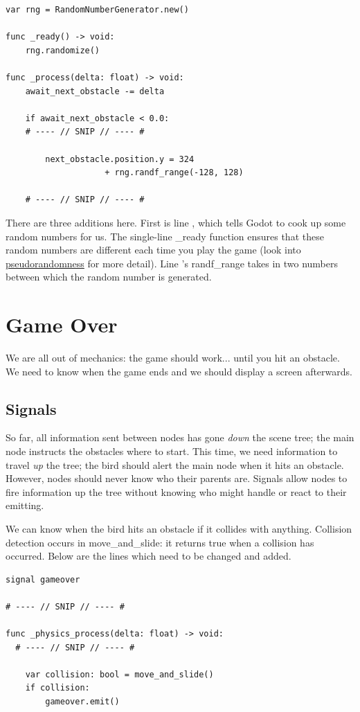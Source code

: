 \documentclass[14pt]{extarticle}
\newcommand{\encircle}[1]{\tikz[baseline=(char.base)]{\node[shape=circle,draw,inner sep=1pt] (char) {#1};}}
\begin{document}
\clearpage
\begin{lstlisting}[language=gdscript, label={lst:obstacle-preload}, caption=Preloading the obstacle]
var rng = RandomNumberGenerator.new()

func _ready() -> void:
	rng.randomize()

func _process(delta: float) -> void:
	await_next_obstacle -= delta
	
	if await_next_obstacle < 0.0:
    # ---- // SNIP // ---- #

		next_obstacle.position.y = 324
                    + rng.randf_range(-128, 128)

    # ---- // SNIP // ---- #
\end{lstlisting}

There are three additions here. First is line \encircle{1}, which tells Godot to cook up some random numbers for us. The single-line \_ready function \encircle{4} ensures that these random numbers are different each time you play the game (look into \href{https://en.wikipedia.org/wiki/Pseudorandomness}{pseudorandomness} for more detail). Line \encircle{13}'s randf\_range takes in two numbers between which the random number is generated.

\clearpage
\section{Game Over}
We are all out of mechanics: the game should work... until you hit an obstacle. We need to know when the game ends and we should display a screen afterwards.

\subsection*{Signals}
So far, all information sent between nodes has gone \emph{down} the scene tree; the main node instructs the obstacles where to start. This time, we need information to travel \emph{up} the tree; the bird should alert the main node when it hits an obstacle. However, nodes should never know who their parents are. Signals allow nodes to fire information up the tree without knowing who might handle or react to their emitting.

We can know when the bird hits an obstacle if it collides with anything. Collision detection occurs in move\_and\_slide: it returns true when a collision has occurred. Below are the lines which need to be changed and added.

\begin{lstlisting}[language=gdscript, label={lst:obstacle-preload}, caption=Preloading the obstacle]
signal gameover

# ---- // SNIP // ---- #

func _physics_process(delta: float) -> void:
  # ---- // SNIP // ---- #

	var collision: bool = move_and_slide()
	if collision:
		gameover.emit()
\end{lstlisting}
\end{document}
